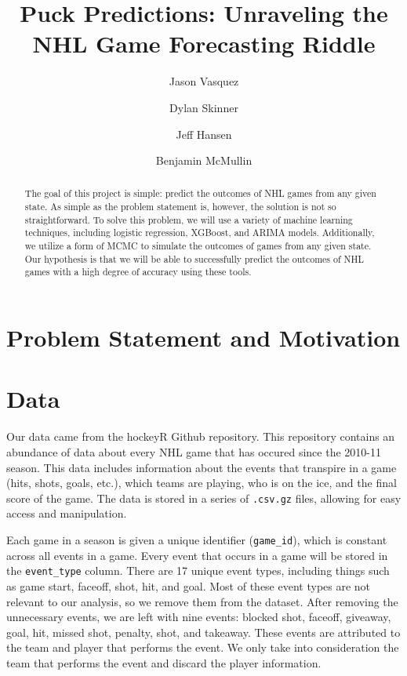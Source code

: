 \documentclass[11pt]{article}
\title{Puck Predictions: Unraveling the NHL Game Forecasting Riddle}
\author{Jason Vasquez \and Dylan Skinner \and Jeff Hansen \and Benjamin McMullin}
\begin{document}
\maketitle

\begin{abstract}
    The goal of this project is simple: predict the outcomes of NHL games from any given state.
    As simple as the problem statement is, however, the solution is not so straightforward.
    To solve this problem, we will use a variety of machine learning techniques, including logistic regression,
    XGBoost, and ARIMA models. Additionally, we utilize a form of MCMC to simulate the outcomes of games from any given
    state. Our hypothesis is that we will be able to successfully predict the outcomes of NHL games with a high degree of accuracy
    using these tools.
\end{abstract}

\section{Problem Statement and Motivation}

\section{Data}
Our data came from the hockeyR Github repository\cite{hockeyR-data}. This repository contains an abundance of data about every NHL game
that has occured since the 2010-11 season. This data includes information about the events that transpire in a game (hits, shots, goals, etc.),
which teams are playing, who is on the ice, and the final score of the game. The data is stored in a series of {\tt .csv.gz} files, allowing for
easy access and manipulation.

Each game in a season is given a unique identifier ({\tt game\_id}), which is constant across all events in a game. Every event that occurs in a game
will be stored in the {\tt event\_type} column. There are 17 unique event types, including things such as game start, faceoff, shot, hit, and goal.
Most of these event types are not relevant to our analysis, so we remove them from the dataset. After removing the unnecessary events, we are left with
nine events: blocked shot, faceoff, giveaway, goal, hit, missed shot, penalty, shot, and takeaway. These events are attributed to the
team and player that performs the event. We only take into consideration the team that performs the event and discard the player information.
\end{document}
